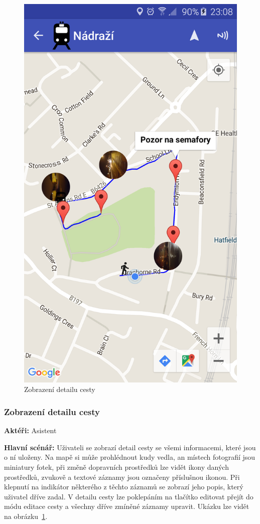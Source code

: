 \documentclass{article}
\newcommand{\usecase}[2]{\subsubsection{#1}\label{#2}}
\begin{document}
\begin{figure}[H]
\begin{minipage}{.5\textwidth}
                    \includegraphics[scale=0.14]{img/screen/detailcesty.png}
            \caption{Zobrazení detailu cesty}
            \label{fig:detailasistent}

       \end{minipage}
\end{figure}

\usecase{Zobrazení detailu cesty}{detailasistent}
\textbf{Aktéři:} Asistent

\vspace{0.1cm}
\noindent
\textbf{Hlavní scénář:} Uživateli se zobrazí detail cesty se všemi informacemi, které jsou o ní uloženy.
Na mapě si může prohlédnout kudy vedla, an místech fotografií jsou miniatury fotek, při změně dopravních
prostředků lze vidět ikony daných prostředků, zvukově a textové záznamy jsou označeny příslušnou ikonou.
Při klepnutí na indikátor některého z těchto záznamů se zobrazí jeho popis, který uživatel dříve zadal.
V detailu cesty lze poklepáním na tlačítko editovat přejít do módu editace cesty a všechny dříve zmíněné
záznamy upravit. Ukázku lze vidět na obrázku~\ref{fig:detailasistent}.
\end{document}

